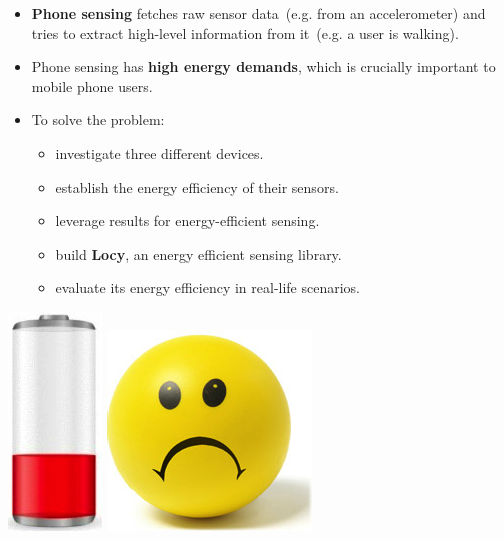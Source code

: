 \documentclass[a2,landscape]{a0poster}
\begin{document}
\begin{itemize}
   \item \textbf{Phone sensing} fetches raw sensor data\ (e.g. from an accelerometer) and tries to extract high-level information from it\ (e.g. a user is walking).
   \item Phone sensing has \textbf{high energy demands}, which is crucially important to mobile phone users.
   \item To solve the problem:
	   \begin{itemize}
   			\item investigate three different devices.
   			\item establish the energy efficiency of their sensors.
   			\item leverage results for energy-efficient sensing.
   			\item build \textbf{Locy}, an energy efficient sensing library.
   			\item evaluate its energy efficiency in real-life scenarios.
	   \end{itemize}
  \end{itemize}
  
\vspace{0.9cm}
\begin{center}
\includegraphics[scale=0.7]{plots/low_battery}
\includegraphics[scale=0.7]{plots/sad_face}
\end{center}
\end{document}
